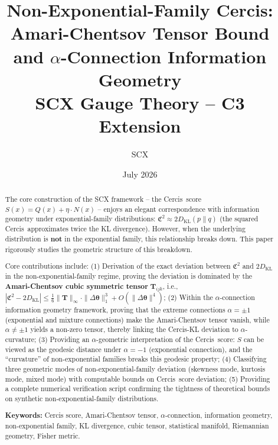 \documentclass[12pt,a4paper]{article}
\title{
    \textbf{Non-Exponential-Family Cercis: Amari-Chentsov Tensor Bound\\and $\alpha$-Connection Information Geometry}\\[0.5em]
    \normalsize SCX Gauge Theory -- C3 Extension
}
\author{SCX}
\date{July 2026}
\theoremstyle{plain}
\theoremstyle{definition}
\theoremstyle{remark}
\newcommand{\SCX}{\textsf{SCX}}
\newcommand{\Cercis}{\textsf{Cercis}}
\newcommand{\DKL}{D_{\mathrm{KL}}}
\newcommand{\CercisScore}{\mathfrak{C}}
\newcommand{\ACT}{\mathbf{T}}    %
\begin{document}
\maketitle

\begin{abstract}
\noindent
The core construction of the \SCX{} framework -- the \Cercis\ score $S(x) = Q(x) + \eta \cdot N(x)$ -- enjoys an elegant correspondence with information geometry under exponential-family distributions: $\CercisScore^2 \approx 2\DKL(p\|q)$ (the squared \Cercis\ approximates twice the KL divergence). However, when the underlying distribution is \textbf{not} in the exponential family, this relationship breaks down. This paper rigorously studies the geometric structure of this breakdown.

Core contributions include: (1) Derivation of the exact deviation between $\CercisScore^2$ and $2\DKL$ in the non-exponential-family regime, proving the deviation is dominated by the \textbf{Amari-Chentsov cubic symmetric tensor} $\ACT_{ijk}$, i.e., $|\CercisScore^2 - 2\DKL| \leq \frac{1}{6}\|\ACT\|_{\infty} \cdot \|\Delta\bm{\theta}\|_1^3 + O(\|\Delta\bm{\theta}\|^4)$; (2) Within the $\alpha$-connection information geometry framework, proving that the extreme connections $\alpha = \pm 1$ (exponential and mixture connections) make the Amari-Chentsov tensor vanish, while $\alpha \neq \pm 1$ yields a non-zero tensor, thereby linking the \Cercis-KL deviation to $\alpha$-curvature; (3) Providing an $\alpha$-geometric interpretation of the \Cercis\ score: $S$ can be viewed as the geodesic distance under $\alpha = -1$ (exponential connection), and the ``curvature'' of non-exponential families breaks this geodesic property; (4) Classifying three geometric modes of non-exponential-family deviation (skewness mode, kurtosis mode, mixed mode) with computable bounds on \Cercis\ score deviation; (5) Providing a complete numerical verification script confirming the tightness of theoretical bounds on synthetic non-exponential-family distributions.

\vspace{0.5em}
\noindent
\textbf{Keywords:} Cercis score, Amari-Chentsov tensor, $\alpha$-connection, information geometry, non-exponential family, KL divergence, cubic tensor, statistical manifold, Riemannian geometry, Fisher metric.
\end{abstract}

\end{document}
